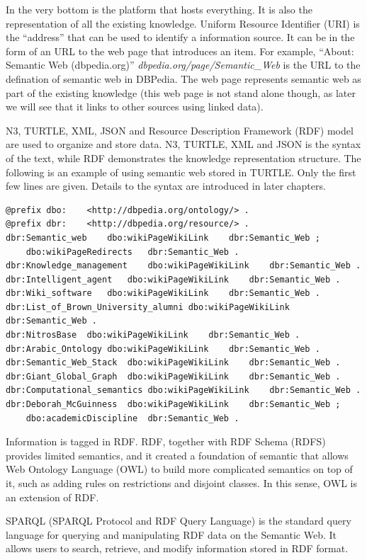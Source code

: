 In the very bottom is the platform that hosts everything. It is also the representation of all the existing knowledge. Uniform Resource Identifier (URI) is the “address” that can be used to identify a information source. It can be in the form of an URL to the web page that introduces an item. For example, ``About: Semantic Web (dbpedia.org)'' \textit{dbpedia.org/page/Semantic_Web} is the URL to the defination of semantic web in DBPedia. The web page represents semantic web as part of the existing knowledge (this web page is not stand alone though, as later we will see that it links to other sources using linked data).

N3, TURTLE, XML, JSON and Resource Description Framework (RDF) model are used to organize and store data. N3, TURTLE, XML and JSON is the syntax of the text, while RDF demonstrates the knowledge representation structure. The following is an example of using semantic web stored in TURTLE. Only the first few lines are given. Details to the syntax are introduced in later chapters.

\begin{lstlisting}
@prefix dbo:	<http://dbpedia.org/ontology/> .
@prefix dbr:	<http://dbpedia.org/resource/> .
dbr:Semantic_web	dbo:wikiPageWikiLink	dbr:Semantic_Web ;
	dbo:wikiPageRedirects	dbr:Semantic_Web .
dbr:Knowledge_management	dbo:wikiPageWikiLink	dbr:Semantic_Web .
dbr:Intelligent_agent	dbo:wikiPageWikiLink	dbr:Semantic_Web .
dbr:Wiki_software	dbo:wikiPageWikiLink	dbr:Semantic_Web .
dbr:List_of_Brown_University_alumni	dbo:wikiPageWikiLink	dbr:Semantic_Web .
dbr:NitrosBase	dbo:wikiPageWikiLink	dbr:Semantic_Web .
dbr:Arabic_Ontology	dbo:wikiPageWikiLink	dbr:Semantic_Web .
dbr:Semantic_Web_Stack	dbo:wikiPageWikiLink	dbr:Semantic_Web .
dbr:Giant_Global_Graph	dbo:wikiPageWikiLink	dbr:Semantic_Web .
dbr:Computational_semantics	dbo:wikiPageWikiLink	dbr:Semantic_Web .
dbr:Deborah_McGuinness	dbo:wikiPageWikiLink	dbr:Semantic_Web ;
	dbo:academicDiscipline	dbr:Semantic_Web .
\end{lstlisting}

Information is tagged in RDF. RDF, together with RDF Schema (RDFS) provides limited semantics, and it created a foundation of semantic that allows Web Ontology Language (OWL) to build more complicated semantics on top of it, such as adding rules on restrictions and disjoint classes. In this sense, OWL is an extension of RDF.

SPARQL (SPARQL Protocol and RDF Query Language) is the standard query language for querying and manipulating RDF data on the Semantic Web. It allows users to search, retrieve, and modify information stored in RDF format.

